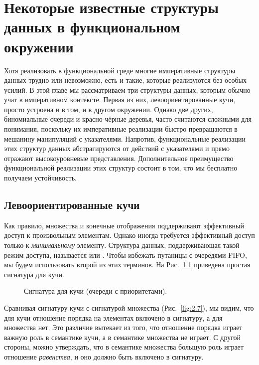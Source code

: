 \chapter{Некоторые известные структуры данных в функциональном
  окружении}
\label{ch:3}

Хотя реализовать в функциональной среде многие императивные структуры
данных трудно или невозможно, есть и такие, которые реализуются без
особых усилий.  В этой главе мы рассматриваем три структуры данных,
которым обычно учат в императивном контексте. Первая из них,
левоориентированные кучи, просто устроена и в том, и в другом
окружении. Однако две других, биномиальные очереди и красно-чёрные
деревья, часто считаются сложными для понимания, поскольку
их императивные реализации быстро превращаются в мешанину манипуляций
с указателями.  Напротив, функциональные реализации этих структур
данных абстрагируются от действий с указателями и прямо отражают
высокоуровневые представления. Дополнительное преимущество
функциональной реализации этих структур состоит в том, что мы
бесплатно получаем устойчивость.

\section{Левоориентированные кучи}
\label{sc:3.1}

Как правило, множества и конечные отображения поддерживают эффективный
доступ к произвольным элементам. Однако иногда требуется эффективный
доступ только к \emph{минимальному} элементу.  Структура данных,
поддерживающая такой режим доступа, называется  или .  Чтобы избежать
путаницы с очередями FIFO, мы будем использовать второй из этих
терминов. На Рис.~\ref{fig:3.1} приведена простая сигнатура для кучи.

\begin{figure}
  \centering
  
  \caption{Сигнатура для кучи (очереди с приоритетами).}
  \label{fig:3.1}
\end{figure}

\begin{remark}
  Сравнивая сигнатуру кучи с сигнатурой множества
  (Рис.~\ref{fig:2.7}), мы видим, что для кучи отношение порядка на
  элементах включено в сигнатуру, а для множества нет.  Это различие
  вытекает из того, что отношение порядка играет важную роль в
  семантике кучи, а в семантике множества не играет.  С другой
  стороны, можно утверждать, что в семантике множества большую роль
  играет отношение \emph{равенства}, и оно должно быть включено в
  сигнатуру.
\end{remark}

